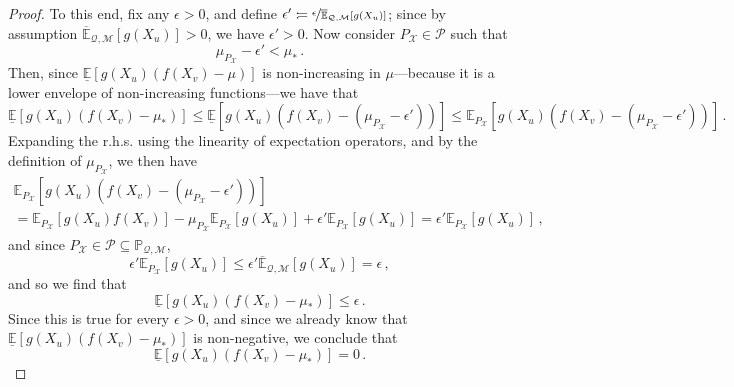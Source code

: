 \documentclass[twoside,11pt]{article}
\newcommand{\states}{\mathcal{X}}
\newcommand{\uexp}{\overline{\mathbb{E}}_{\rateset,\mathcal{M}}}
\newcommand{\rateset}{\mathcal{Q}}
\newcommand{\coloneqq}{:\!=}
\begin{document}
\begin{proof}
To this end, fix any $\epsilon>0$, and define $\epsilon'\coloneqq \nicefrac{\epsilon}{\uexp[g(X_u)]}$; since by assumption $\uexp[g(X_u)]>0$, we have $\epsilon' >0$. Now consider ${P_\states}\in\mathcal{P}$ such that
\begin{equation*}
\mu_{P_\states} - \epsilon' < \mu_*\,.
\end{equation*}
Then, since $\underline{\mathbb{E}}[g(X_u)(f(X_v) - \mu)]$ is non-increasing in $\mu$---because it is a lower envelope of non-increasing functions---we have that
\begin{equation*}
\underline{\mathbb{E}}[g(X_u)(f(X_v) - \mu_*)] \leq \underline{\mathbb{E}}[g(X_u)(f(X_v) - (\mu_{P_\states} - \epsilon'))]\leq \mathbb{E}_{P_\states}[g(X_u)(f(X_v) - (\mu_{P_\states} - \epsilon'))]\,.
\end{equation*}
Expanding the r.h.s. using the linearity of expectation operators, and by the definition of $\mu_{P_\states}$, we then have
\begin{multline*}
\mathbb{E}_{P_\states}[g(X_u)(f(X_v) - (\mu_{P_\states} - \epsilon'))]\\ = \mathbb{E}_{P_\states}[g(X_u)f(X_v)] - \mu_{P_\states}\mathbb{E}_{P_\states}[g(X_u)] + \epsilon'\mathbb{E}_{P_\states}[g(X_u)] = \epsilon'\mathbb{E}_{P_\states}[g(X_u)]\,,
\end{multline*}
and since ${P_\states}\in\mathcal{P}\subseteq\mathbb{P}_{\rateset,\mathcal{M}}$,
\begin{equation*}
\epsilon'\mathbb{E}_{P_\states}[g(X_u)] \leq \epsilon'\uexp[g(X_u)]=\epsilon\,,
\end{equation*}
and so we find that
\begin{equation*}
\underline{\mathbb{E}}[g(X_u)(f(X_v) - \mu_*)] \leq \epsilon\,.
\end{equation*}
Since this is true for every $\epsilon>0$, and since we already know that $\underline{\mathbb{E}}[g(X_u)(f(X_v) - \mu_*)]$ is non-negative, we conclude that
\begin{equation*}
\underline{\mathbb{E}}[g(X_u)(f(X_v) - \mu_*)] = 0\,.
\end{equation*}


\end{proof}
\end{document}
